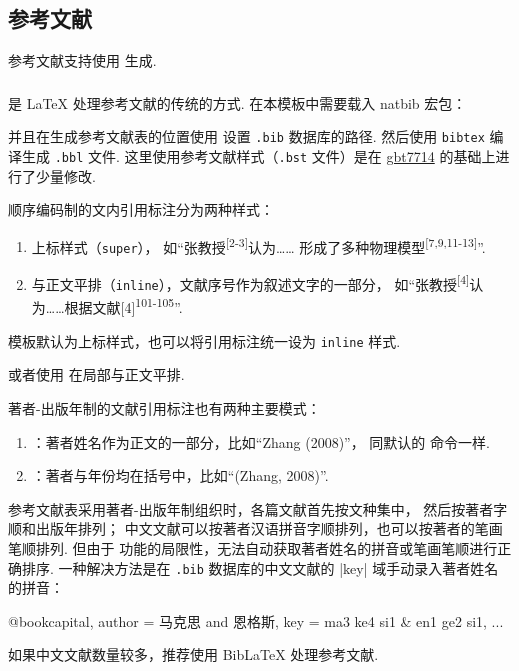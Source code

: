 \documentclass[a4paper]{ltxdoc}
\DeclareRobustCommand\file{\nolinkurl}
\DeclareRobustCommand\pkg{\textsf}
\DeclareRobustCommand\opt{\texttt}
\begin{document}
\subsection{参考文献}

参考文献支持使用 \BibTeX{} 生成.


\subsubsection{\BibTeX}

\BibTeX{} 是 \LaTeX{} 处理参考文献的传统的方式.
在本模板中需要载入 \pkg{natbib} 宏包：
\begin{latex}
  \usepackage[sort]{natbib}
  
\end{latex}
并且在生成参考文献表的位置使用  设置 \file{.bib} 数据库的路径.
然后使用 \file{bibtex} 编译生成 \file{.bbl} 文件.
这里使用参考文献样式（\file{.bst} 文件）是在
\href{https://ctan.org/pkg/gbt7714}{\pkg{gbt7714}}
的基础上进行了少量修改.

顺序编码制的文内引用标注分为两种样式：
\begin{enumerate}
  \item 上标样式（\opt{super}）， 如“张教授\textsuperscript{[2-3]}认为……
    形成了多种物理模型\textsuperscript{[7,9,11-13]}”.
  \item 与正文平排（\opt{inline}），文献序号作为叙述文字的一部分，
    如“张教授\textsuperscript{[4]}认为……根据文献[4]\textsuperscript{101-105}”.
\end{enumerate}

模板默认为上标样式，也可以将引用标注统一设为 \opt{inline} 样式.
\begin{latex}
\end{latex}
或者使用  在局部与正文平排.

著者-出版年制的文献引用标注也有两种主要模式：
\begin{enumerate}
  \item {}：著者姓名作为正文的一部分，比如“Zhang (2008)”，
    同默认的  命令一样.
  \item {}：著者与年份均在括号中，比如“(Zhang, 2008)”.
\end{enumerate}

参考文献表采用著者-出版年制组织时，各篇文献首先按文种集中， 然后按著者字顺和出版年排列；
中文文献可以按著者汉语拼音字顺排列，也可以按著者的笔画笔顺排列.
但由于 \BibTeX{} 功能的局限性，无法自动获取著者姓名的拼音或笔画笔顺进行正确排序.
一种解决方法是在 \file{.bib} 数据库的中文文献的 |key| 域手动录入著者姓名的拼音：
\begin{latex}
  @book{capital,
    author = {马克思 and 恩格斯},
    key    = {ma3 ke4 si1 & en1 ge2 si1},
    ...
  }
\end{latex}
如果中文文献数量较多，推荐使用 BibLaTeX 处理参考文献.
\end{document}
